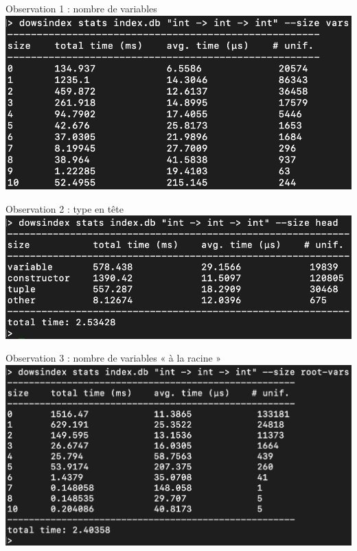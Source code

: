 \documentclass[serif]{beamer}
\newcommand{\?}{\stackrel{?}{=}}
\begin{document}
\begin{frame}{Observation 1 : nombre de variables}
  \includegraphics[scale=0.32,center]{images/stats1}
\end{frame}


\begin{frame}{Observation 2 : type en tête}
  \includegraphics[scale=0.32,center]{images/stats2}
\end{frame}


\begin{frame}{Observation 3 : nombre de variables « à la racine »}
  \includegraphics[scale=0.32,center]{images/stats3}
\end{frame}
\end{document}
